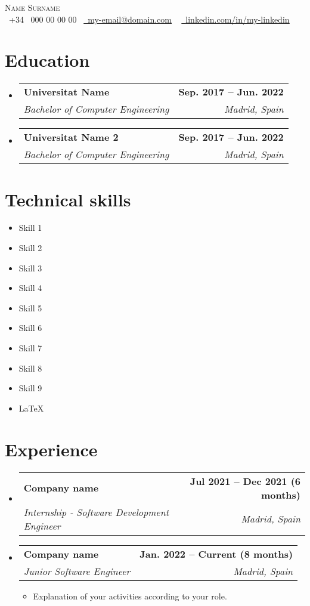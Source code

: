 \documentclass[letterpaper,11pt]{article}
\makeatletter
\def\name{Name}
\def\surname{Surname}
\def\phonePrefix{34}
\def\phone{000 00 00 00}
\def\email{\ul{my-email@domain.com}}
\def\linkedin{\ul{linkedin.com/in/my-linkedin}}
\newcommand{\resumeItem}[1]{
	\item\small{
		{#1 \vspace{-2pt}}
	}
}
\newcommand{\resumeSubheading}[4]{
	\vspace{-2pt}\item
	\begin{tabular*}{1.0\textwidth}[t]{l@{\extracolsep{\fill}}r}
		\textbf{#1} & \textbf{\small #2} \\
		\textit{\small#3} & \textit{\small #4} \\
	\end{tabular*}\vspace{-7pt}
}
\newcommand{\resumeSubHeadingListStart}{\begin{itemize}[leftmargin=0.0in, label={}]}
\newcommand{\resumeSubHeadingListEnd}{\end{itemize}}
\newcommand{\resumeItemListStart}{\begin{itemize}}
\newcommand{\resumeItemListEnd}{\end{itemize}\vspace{-20pt}}
\makeatother
\begin{document}
	\begin{center}
		{\Huge \scshape {\color{colorNombre}\name} \surname} \\ \vspace{1pt}
		\vspace{0.4cm}
		\small \raisebox{-0.1\height}{\color{colorSimbolos}{\faPhone}}\ +\phonePrefix ~ \phone ~ \href{mailto:email@mail.com}{\raisebox{-0.2\height}{\color{colorSimbolos}{\faEnvelope}}\  {\email}} ~ 
		\href{https://linkedin.com/in//}{\raisebox{-0.2\height}{\color{colorSimbolos}{\faLinkedin}}\ {\linkedin}}  ~
		\vspace{0.2cm}
	\end{center}

	\section{Education}
	\resumeSubHeadingListStart
		\resumeSubheading
			{Universitat Name}{Sep. 2017 -- Jun. 2022}
			{Bachelor of Computer Engineering}{Madrid, Spain}
		\resumeSubheading
			{Universitat Name 2}{Sep. 2017 -- Jun. 2022}
			{Bachelor of Computer Engineering}{Madrid, Spain}
	\resumeSubHeadingListEnd
	
	\section{Technical skills}
	\begin{multicols}{2}
	\begin{itemize}[itemsep=1pt, parsep=3pt]
		\item Skill 1
		\item Skill 2
		\item Skill 3
		\item Skill 4
		\item Skill 5
		\item Skill 6
		\item Skill 7
		\item Skill 8
		\item Skill 9
		\item \LaTeX
	\end{itemize}
	\end{multicols}
	
	\section{Experience}
		\resumeSubHeadingListStart
			\resumeSubheading
				{Company name}{Jul 2021 -- Dec 2021 (6 months)}
				{Internship - Software Development Engineer}{Madrid, Spain}
			\resumeSubheading
				{Company name}{Jan. 2022 -- Current (8 months)}
				{Junior Software Engineer}{Madrid, Spain}
			\resumeItemListStart
				\resumeItem{Explanation of your activities according to your role. }
			\resumeItemListEnd
		\resumeSubHeadingListEnd
\end{document}
